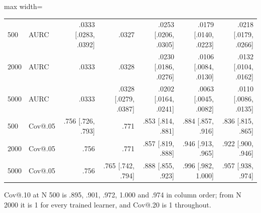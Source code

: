 \documentclass[10pt,letterpaper]{article}
\theoremstyle{plain}
\begin{document}
\begin{table}[H]
\begin{adjustbox}{max width=\textwidth}
\begin{tabular}{llrrrrr}
500 & AURC & .0333 [.0283, .0392] & .0327 & .0253 [.0206, .0305] & .0179 [.0140, .0223] & .0218 [.0179, .0266] \\
2000 & AURC & .0333 & .0328 & .0230 [.0186, .0276] & .0106 [.0084, .0130] & .0132 [.0104, .0162] \\
5000 & AURC & .0333 & .0328 [.0279, .0387] & .0202 [.0164, .0241] & .0063 [.0045, .0082] & .0110 [.0086, .0135] \\
500 & Cov@.05 & .756 [.726, .793] & .771 & .853 [.814, .881] & .884 [.857, .916] & .836 [.815, .865] \\
2000 & Cov@.05 & .756 & .771 & .857 [.819, .888] & .946 [.913, .965] & .922 [.900, .946] \\
5000 & Cov@.05 & .756 & .765 [.742, .794] & .888 [.855, .923] & .996 [.982, 1.000] & .957 [.938, .974] \\
\bottomrule
\end{tabular}
\end{adjustbox}
\end{table}

Cov@.10 at N 500 is .895, .901, .972, 1.000 and .974 in column order; from N 2000 it is 1 for every trained learner, and Cov@.20 is 1 throughout.
\end{document}
